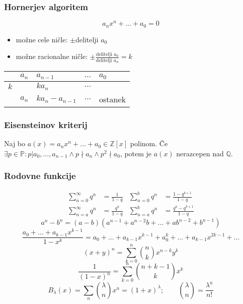 	\subsubsection*{Hornerjev algoritem}
	\[a_n x^n + ... + a_0 = 0\]
	\begin{itemize}
		\item možne cele ničle: $\pm$delitelji $a_0$
		\item možne racionalne ničle: $\pm \frac{\text{delitelji }a_0}{\text{delitelji }a_n} = k$
	\end{itemize}
	\begin{center}
		\begin{tabular}{ l|l l l l}
				& $a_n$ & $a_{n-1}$ & $...$ & $a_0$ \\ \hline
			$k$ &       & $ka_n$    & $...$ & \\ \hline
				& $a_n$ & $ka_n - a_{n-1}$ & $...$ & ostanek\\
		\end{tabular}
	\end{center}

	\subsubsection*{Eisensteinov kriterij}
	Naj bo $a(x) = a_n x^n + \dots + a_0 \in \mathbb{Z}[x]$ polinom. Če $\exists p \in \mathbb{P} : p | a_0, \dots, a_{n-1} \wedge p \nmid a_n \wedge p^2 \nmid a_0$, potem je $a(x)$ nerazcepen nad $\mathbb{Q}$.

	\subsubsection*{Rodovne funkcije}
	\[
		\begin{aligned}
			\sum_{n=0}^{\infty} q^n &= \frac{1}{1-q} &
			\sum_{n=0}^{b} q^n &= \frac{1-q^{b+1}}{1-q}
			\\
			\sum_{n=a}^{\infty} q^n &= \frac{q^{a}}{1-q} &
			\sum_{n=a}^{b} q^n &= \frac{q^a-q^{b+1}}{1-q}
		\end{aligned}
	\]
	\[
		a^n - b^n = (a-b)(a^{n-1} + a^{n-2}b + ... + ab^{n-2} + b^{n-1})  
	\]
	\[ \textstyle \frac{a_0 + ... + a_{k-1}x^{k-1}}{1-x^k} = a_0 + ... + a_{k-1}x^{k-1} + a_0^k + ... + a_{k-1}x^{2k-1} + ...\]
	\[ (x+y)^n = \sum_{k=0}^{n} \binom{n}{k} x^{n-k}y^{k} \]
	\[ \frac{1}{(1-x)^n} = \sum_{k=0}^{n} \binom{n+k-1}{k} x^{k} \]
	\[ B_\lambda(x) = \sum_{n} \binom{\lambda}{n} x^{n} = (1+x)^\lambda; \qquad \binom{\lambda}{n} = \frac{\lambda^{\underline{n}}}{n!}\]

